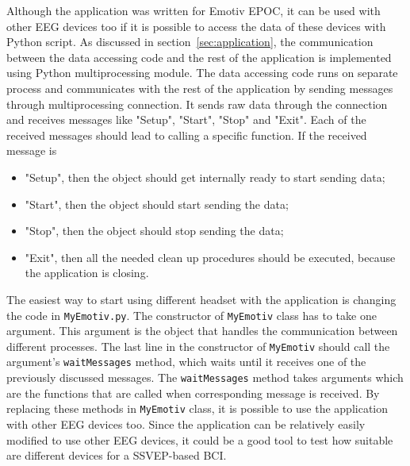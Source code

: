 Although the application was written for Emotiv EPOC, it can be used with other \gls{EEG} devices too if it is possible to access the data of these devices with Python script. As discussed in section~\ref{sec:application}, the communication between the data accessing code and the rest of the application is implemented using Python multiprocessing module. The data accessing code runs on separate process and communicates with the rest of the application by sending messages through multiprocessing connection. It sends raw data through the connection and receives messages like "Setup", "Start", "Stop" and "Exit". Each of the received messages should lead to calling a specific function. If the received message is
\begin{itemize}
	\item "Setup", then the object should get internally ready to start sending data;
	\item "Start", then the object should start sending the data;
	\item "Stop", then the object should stop sending the data;
	\item "Exit", then all the needed clean up procedures should be executed, because the application is closing.
\end{itemize}

The easiest way to start using different headset with the application is changing the code in \texttt{MyEmotiv.py}. The constructor of \texttt{MyEmotiv} class has to take one argument. This argument is the object that handles the communication between different processes. The last line in the constructor of \texttt{MyEmotiv} should call the argument's \texttt{waitMessages} method, which waits until it receives one of the previously discussed messages. The \texttt{waitMessages} method takes arguments which are the functions that are called when corresponding message is received. By replacing these methods in \texttt{MyEmotiv} class, it is possible to use the application with other \gls{EEG} devices too. Since the application can be relatively easily modified to use other \gls{EEG} devices, it could be a good tool to test how suitable are different devices for a \gls{SSVEP}-based \gls{BCI}.
